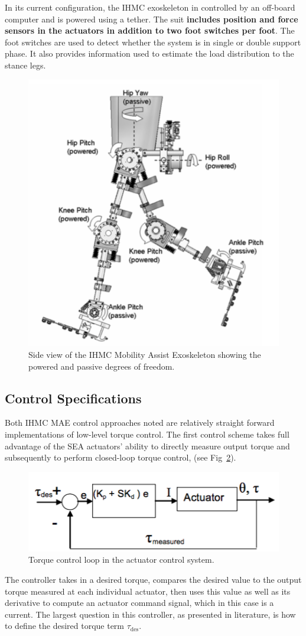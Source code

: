 \begin{refsection}
 In its current configuration, the IHMC exoskeleton in controlled by an off-board computer and is powered using a tether. The suit {\bf includes position and force sensors in the actuators in addition to two foot switches per foot}.  The foot switches are used to detect whether the system is in single or double support phase.  It also provides information used to estimate the load distribution to the stance legs.
 
 
 \begin{figure}[thpb]
\centering
\includegraphics[width=3.in]{exos/figs/ihmc/ihmcSys}
  \caption{Side view of the IHMC Mobility Assist Exoskeleton showing the powered and passive degrees of freedom.}
 \label{fig:IHMCSYS}   
 \end{figure}
 
 
 \subsection{Control Specifications}
 
 Both IHMC MAE control approaches noted are relatively straight forward implementations of low-level torque control.  The first control scheme takes full advantage of the SEA actuators' ability to directly measure output torque and subsequently to perform closed-loop torque control, (see Fig~\ref{fig:IHMCTOR}). 
  \begin{figure}[thpb]
\centering
\includegraphics[width=3.in]{exos/figs/ihmc/torqueCon}
  \caption{Torque control loop in the actuator control system.}
 \label{fig:IHMCTOR}   
 \end{figure}
 The controller takes in a desired torque, compares the desired value to the output torque measured at each individual actuator, then uses this value as well as its derivative to compute an actuator command signal, which in this case is a current.  The largest question in this controller, as presented in literature, is how to define the desired torque term $\tau_\text{des}$.
 

\end{refsection}

